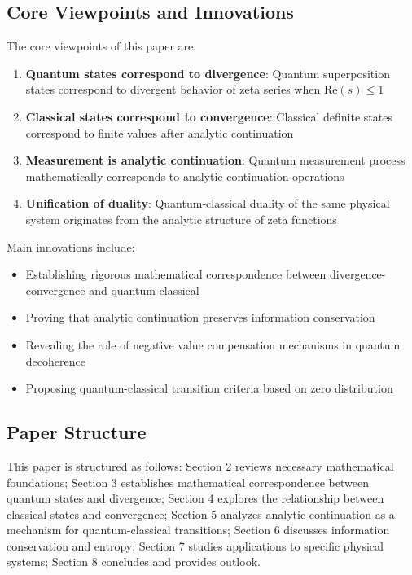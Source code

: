 \documentclass[11pt]{article}
\theoremstyle{plain}
\theoremstyle{definition}
\theoremstyle{remark}
\begin{document}
\subsection{Core Viewpoints and Innovations}

The core viewpoints of this paper are:
\begin{enumerate}
\item \textbf{Quantum states correspond to divergence}: Quantum superposition states correspond to divergent behavior of zeta series when $\text{Re}(s) \leq 1$
\item \textbf{Classical states correspond to convergence}: Classical definite states correspond to finite values after analytic continuation
\item \textbf{Measurement is analytic continuation}: Quantum measurement process mathematically corresponds to analytic continuation operations
\item \textbf{Unification of duality}: Quantum-classical duality of the same physical system originates from the analytic structure of zeta functions
\end{enumerate}

Main innovations include:
\begin{itemize}
\item Establishing rigorous mathematical correspondence between divergence-convergence and quantum-classical
\item Proving that analytic continuation preserves information conservation
\item Revealing the role of negative value compensation mechanisms in quantum decoherence
\item Proposing quantum-classical transition criteria based on zero distribution
\end{itemize}

\subsection{Paper Structure}

This paper is structured as follows: Section 2 reviews necessary mathematical foundations; Section 3 establishes mathematical correspondence between quantum states and divergence; Section 4 explores the relationship between classical states and convergence; Section 5 analyzes analytic continuation as a mechanism for quantum-classical transitions; Section 6 discusses information conservation and entropy; Section 7 studies applications to specific physical systems; Section 8 concludes and provides outlook.
\end{document}

